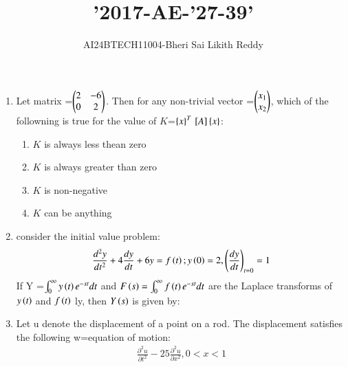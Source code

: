 \documentclass[journal]{IEEEtran}
\begin{document}

\onecolumn
\newpage
\title{'2017-AE-'27-39'}
\author{AI24BTECH11004-Bheri Sai Likith Reddy}
\maketitle


\begin{enumerate}
       \item Let matrix =$\begin{pmatrix}2&-6\\0&2\end{pmatrix}$. Then for any non-trivial vector =$\begin{pmatrix}x_1\\x_2\end{pmatrix}$, which of the followning is true for the value of $K$=$\left\{x\right\}^T{}\left[A\right]\left\{x\right\}$:
       \begin{enumerate}
           \item $K$ is always less thean zero 
           \item $K$ is always greater than zero
           \item $K$ is non-negative
           \item $K$ can be anything 
       \end{enumerate}
	\item consider the initial value problem:
        \begin{align*}
            \frac{d^2y}{dt^2}+4\frac{dy}{dt}+6y=f\left(t\right); y\left(0\right)=2,\left(\frac{dy}{dt}\right)_{t=0} =1
        \end{align*}
        If Y =$\int^\infty_0 y\left(t\right)e^{-st}dt$ and $F\left(s\right)=\int^\infty_0 f\left(t\right)e^{-st}dt$ are the Laplace transforms of $y\left(t\right)$ and $f\left(t\right)$ ly, then $Y\left(s\right)$ is given by:
               \begin{enumerate}
	       \end{enumerate}	
       \item Let u denote the displacement of a point on a rod. The displacement satisfies the following w=equation of motion:
       \begin{align*}
           \frac{\partial^2u}{\partial t^2}-25\frac{\partial^2u}{\partial x^2}, 0<x<1

\end{align*}
\end{enumerate}
\end{document}

